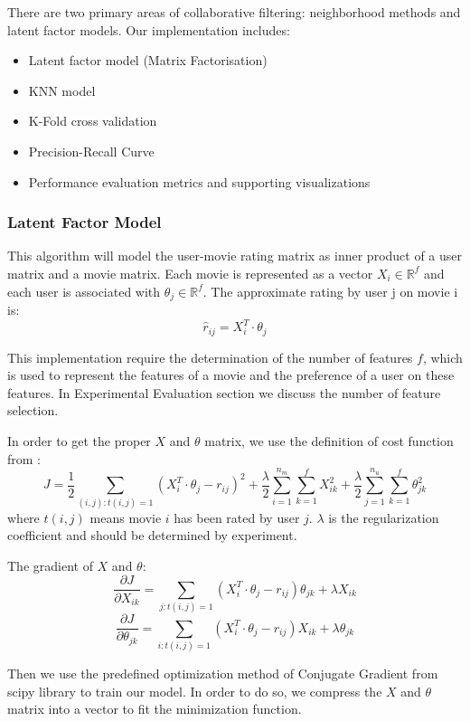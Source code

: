 \documentclass[10pt]{article}
\begin{document}
There are two primary areas of collaborative filtering: neighborhood methods and latent factor models\cite{MF}. Our implementation includes: 

\begin{itemize} 
	\item Latent factor model (Matrix Factorisation)
	\item KNN model
	\item K-Fold cross validation
	\item Precision-Recall Curve 
	\item Performance evaluation metrics and supporting visualizations
\end{itemize}


\subsubsection{Latent Factor Model}
This algorithm will model the user-movie rating matrix as inner product of a user matrix and a movie matrix. Each movie is represented as a vector $X_i \in \mathbb{R}^f$ and each user is associated with $\theta_j \in \mathbb{R}^f$. The approximate rating by user j on movie i is:
$$\hat{r}_{ij} = X_i^T \cdot \theta_j$$

This implementation require the determination of the number of features $f$, which is used to represent the features of a movie and the preference of a user on these features. In Experimental Evaluation section we discuss the number of feature selection.

In order to get the proper $X$ and $\theta$ matrix, we use the definition of cost function from \cite{MF}:
$$J = \frac{1}{2}\sum_{(i,j):t(i,j)=1}(X_i^T \cdot \theta_j - r_{ij})^2+\frac{\lambda}{2}\sum_{i = 1}^{n_m}\sum_{k = 1}^{f}X_{ik}^{2}+\frac{\lambda}{2}\sum_{j = 1}^{n_u}\sum_{k = 1}^{f}\theta_{jk}^{2}$$
where $t(i,j)$ means movie $i$ has been rated by user $j$. $\lambda$ is the regularization coefficient and should be determined by experiment.

The gradient of $X$ and $\theta$:
$$\frac{\partial J}{\partial X_{ik}} = \sum_{j:t(i,j)=1}(X_i^T \cdot \theta_j - r_{ij})\theta_{jk}+\lambda X_{ik}$$
$$\frac{\partial J}{\partial \theta_{jk}} = \sum_{i:t(i,j)=1}(X_i^T \cdot \theta_j - r_{ij})X_{ik}+\lambda \theta_{jk}$$

Then we use the predefined optimization method of Conjugate Gradient from scipy library to train our model. In order to do so, we compress the $X$ and $\theta$ matrix into a vector to fit the minimization function.
\end{document}
